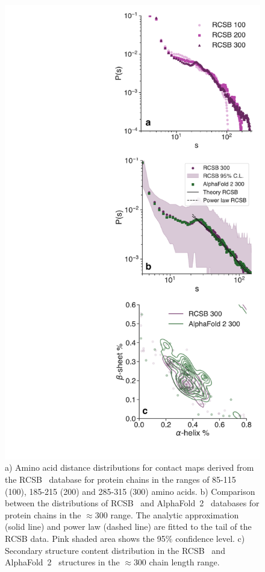 \documentclass[
reprint,
twocolumn,
amsmath,amssymb,superscriptaddress,aps,
pre]{revtex4-1}
\begin{document}
\begin{figure}[h!]
        \centering
	\includegraphics[width=\columnwidth]{paper/figures/Fig4/Fig4.pdf}
        \caption{a) Amino acid distance distributions for contact maps derived from the RCSB~\cite{PDB} database for protein chains in the ranges of 85-115 (100), 185-215 (200) and 285-315 (300) amino acids. b) Comparison between the distributions of RCSB~\cite{PDB} and AlphaFold~2~\cite{jumper2021highly} databases for protein chains in the $\approx300$ range. The analytic approximation (solid line) and power law (dashed line) are fitted to the tail of the RCSB data. Pink shaded area shows the 95\% confidence level. c) Secondary structure content distribution in the RCSB~\cite{PDB} and AlphaFold~2~\cite{jumper2021highly} structures in the $\approx300$ chain length range.}
        \label{fig:sdd}
\end{figure}
\end{document}
